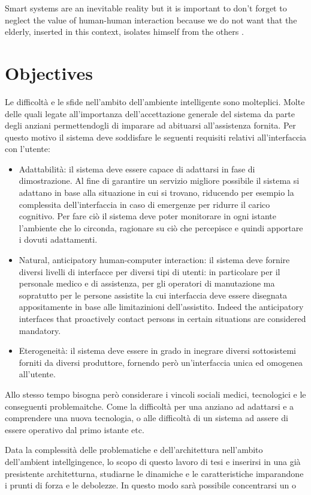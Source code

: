 \documentclass{thesisreport}
\begin{document}
 Smart systems are an inevitable reality but it is important to don't forget to neglect the value of human-human interaction because we do not want that the elderly, inserted in this context, isolates himself from the others \cite{phdthesis}.
 
 \section{Objectives}
 Le difficoltà e le sfide nell’ambito dell’ambiente intelligente sono molteplici. Molte delle quali legate all'importanza dell'accettazione generale del sistema da parte degli anziani permettendogli di imparare ad abituarsi all'assistenza fornita. Per questo motivo il sistema deve soddisfare le seguenti requisiti relativi all'interfaccia con l'utente:
 \begin{itemize}
     \item Adattabilità: il sistema deve essere capace di adattarsi in fase di dimostrazione. Al fine di garantire un servizio migliore possibile il sistema si adattano in base alla situazione in cui si trovano, riducendo per esempio la complessita dell'interfaccia in caso di emergenze per ridurre il carico cognitivo. Per fare ciò il sistema deve poter monitorare in ogni istante l'ambiente che lo circonda, ragionare su ciò che percepisce e quindi apportare i dovuti adattamenti. 
     \item  Natural, anticipatory human-computer interaction: il sistema deve fornire diversi livelli di interfacce per diversi tipi di utenti: in particolare per il personale medico e di assistenza, per gli operatori di manutazione ma sopratutto per le persone assistite la cui interfaccia deve essere disegnata appositamente in base alle limitazinioni dell'assistito. Indeed the anticipatory interfaces that proactively contact persons in certain situations are considered mandatory.
     \item Eterogeneità: il sistema deve essere in grado in inegrare diversi sottosistemi forniti da diversi produttore, fornendo però un'interfaccia unica ed omogenea all'utente.
 \end{itemize}
 Allo stesso tempo bisogna però considerare i vincoli sociali medici, tecnologici e le  conseguenti problemaitche. 
 Come la difficoltà per una anziano ad adattarsi e a comprendere una nuova tecnologia, o alle difficoltà di un sistema ad assere di essere operativo dal primo istante etc.
 
 Data la complessità delle problematiche e dell'architettura nell'ambito dell'ambient intellgingence, lo scopo di questo lavoro di tesi e inserirsi in una già presistente architetturna, studiarne le dinamiche e le caratteristiche imparandone i prunti di forza e le debolezze. In questo modo sarà possibile concentrarsi un o 
 
\end{document}
